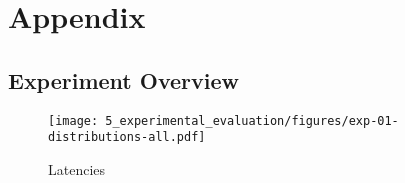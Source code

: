 \chapter*{Appendix}





\section{Experiment Overview}





\begin{figure}[p]
    \centering
    
    \texttt{[image: 5\_experimental\_evaluation/figures/exp-01-distributions-all.pdf]}

    \caption[Histogram of latencies under maximum load]{Latencies}
    \label{fig:exp:01:hist-latency-traefik}
\end{figure}


